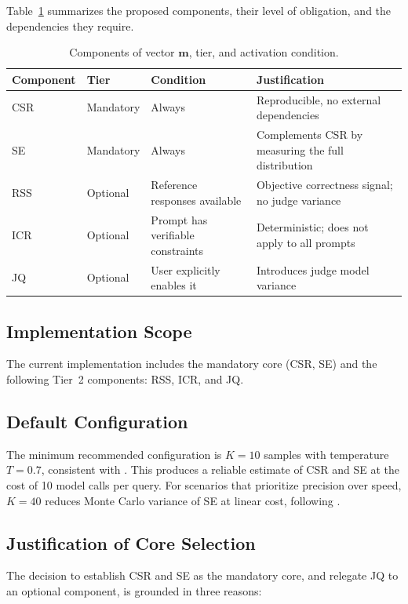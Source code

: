 \documentclass[11pt,a4paper]{article}
\begin{document}
Table~\ref{tab:components} summarizes the proposed components, their level of obligation, and the dependencies they require.

\begin{table}[h]
\centering
\caption{Components of vector $\mathbf{m}$, tier, and activation condition.}
\label{tab:components}
\begin{tabular}{lllp{5cm}}
\toprule
Component & Tier & Condition & Justification \\
\midrule
CSR & Mandatory & Always & Reproducible, no external dependencies \\
SE  & Mandatory & Always & Complements CSR by measuring the full distribution \\
RSS & Optional & Reference responses available & Objective correctness signal; no judge variance \\
ICR & Optional & Prompt has verifiable constraints & Deterministic; does not apply to all prompts \\
JQ  & Optional & User explicitly enables it & Introduces judge model variance \\
\bottomrule
\end{tabular}
\end{table}

\subsection{Implementation Scope}

The current implementation includes the mandatory core (CSR, SE) and the following Tier~2 components: RSS, ICR, and JQ.

\subsection{Default Configuration}

The minimum recommended configuration is $K=10$ samples with temperature $T=0.7$, consistent with \citet{glape2024}. This produces a reliable estimate of CSR and SE at the cost of 10 model calls per query. For scenarios that prioritize precision over speed, $K=40$ reduces Monte Carlo variance of SE at linear cost, following \citet{selfconsistency2023}.

\subsection{Justification of Core Selection}

The decision to establish CSR and SE as the mandatory core, and relegate JQ to an optional component, is grounded in three reasons:
\end{document}
